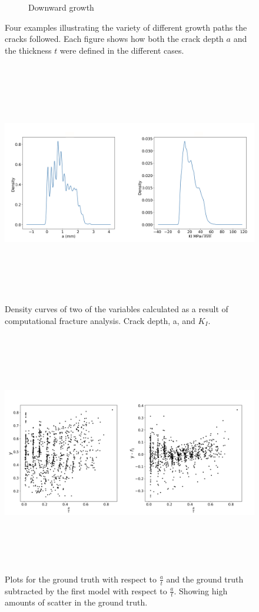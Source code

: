 \begin{figure}[h!]
\begin{subfigure}[b]{0.5\textwidth}
    \caption{Downward growth}
    \label{fig:downward_growth}
  \end{subfigure}
  \caption{Four examples illustrating the variety of different growth paths the
cracks followed. Each figure shows how both the crack depth $a$ and the thickness
$t$ were defined in the different cases.}
  \label{fig:crack_paths}
\end{figure}

\begin{figure}[h!]
\centering
\includegraphics[width=\textwidth,height=300pt,keepaspectratio]{aKI_pde.png}
\caption{Density curves of two of the variables calculated as a result of
computational fracture analysis. Crack depth, a, and $K_I$.
}
\label{fig:aKI_pde}
\end{figure}

\begin{figure}[h!]
\centering
\includegraphics[width=\textwidth,height=300pt,keepaspectratio]{f_fsubm1.png}

\caption{Plots for the ground truth with respect to $\frac{a}{t}$ and the ground
truth subtracted by the first model with respect to $\frac{a}{t}$. Showing high
amounts of scatter in the ground truth.  }

\label{fig:f_fsubm1}
\end{figure}

